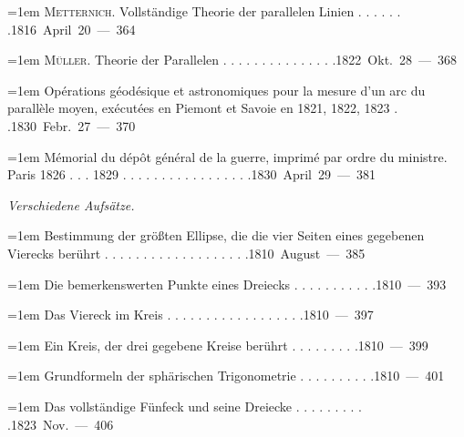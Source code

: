 \par\noindent\hangindent=1em \textsc{Metternich}. Vollständige Theorie der parallelen Linien . . . . . . .\hfill{}\hbox{}\nobreak\hfill\mbox{1816 April 20 — 364}\par
\par\noindent\hangindent=1em \textsc{Müller}. Theorie der Parallelen . . . . . . . . . . . . . . .\hfill{}\hbox{}\nobreak\hfill\mbox{1822 Okt. 28 — 368}\par
\par\noindent\hangindent=1em Opérations géodésique et astronomiques pour la mesure d’un arc du parallèle moyen, exécutées en Piemont et Savoie en 1821, 1822, 1823 . .\hfill{}\hbox{}\nobreak\hfill\mbox{1830 Febr. 27 — 370}\par
\par\noindent\hangindent=1em Mémorial du dépôt général de la guerre, imprimé par ordre du ministre. Paris 1826 . . . 1829 . . . . . . . . . . . . . . . . .\hfill{}\hbox{}\nobreak\hfill\mbox{1830 April 29 — 381}\par
\par\medskip{}
\noindent\textit{Verschiedene Aufsätze.}\par
\par\noindent\hangindent=1em Bestimmung der größten Ellipse, die die vier Seiten eines gegebenen Vierecks berührt . . . . . . . . . . . . . . . . . . .\hfill{}\hbox{}\nobreak\hfill\mbox{1810 August — 385}\par
\par\noindent\hangindent=1em Die bemerkenswerten Punkte eines Dreiecks . . . . . . . . . . .\hfill{}\hbox{}\nobreak\hfill\mbox{1810 — 393}\par
\par\noindent\hangindent=1em Das Viereck im Kreis . . . . . . . . . . . . . . . . . .\hfill{}\hbox{}\nobreak\hfill\mbox{1810 — 397}\par
\par\noindent\hangindent=1em Ein Kreis, der drei gegebene Kreise berührt . . . . . . . . .\hfill{}\hbox{}\nobreak\hfill\mbox{1810 — 399}\par
\par\noindent\hangindent=1em Grundformeln der sphärischen Trigonometrie . . . . . . . . . .\hfill{}\hbox{}\nobreak\hfill\mbox{1810 — 401}\par
\par\noindent\hangindent=1em Das vollständige Fünfeck und seine Dreiecke . . . . . . . . . .\hfill{}\hbox{}\nobreak\hfill\mbox{1823 Nov. — 406}\par
